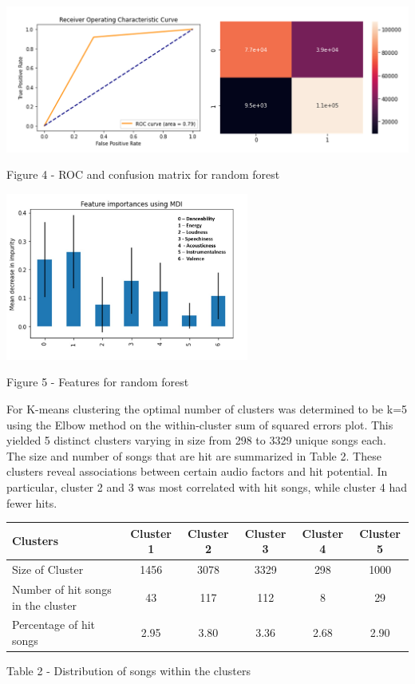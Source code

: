 \documentclass{article}
\begin{document}
\begin{center}
  \includegraphics[width=1\textwidth]{ROC for random forest.png}
\end{center}
\begin{center}
    \footnotesize{Figure 4 - ROC and confusion matrix for random forest} 
\end{center}



\begin{center}
  \includegraphics[width=0.6\textwidth]{output.png} %
\end{center}
\begin{center}
  \footnotesize{Figure 5 - Features for random forest}
\end{center}

For K-means clustering the optimal number of clusters was determined to be k=5 using the Elbow method on the within-cluster sum of squared errors plot. This yielded 5 distinct clusters varying in size from 298 to 3329 unique songs each. The size and number of songs that are hit are summarized in Table 2. These clusters reveal associations between certain audio factors and hit potential. In particular, cluster 2 and 3 was most correlated with hit songs, while cluster 4 had fewer hits. 

\begin{center}
\centering
  \begin{tabular}{|l|c|c|c|c|c|}
    \hline
    Clusters & Cluster 1 & Cluster 2 & Cluster 3 & Cluster 4 & Cluster 5 \\
    \hline
    Size of Cluster & 1456 & 3078 & 3329 & 298 & 1000 \\
    \hline
    Number of hit songs in the cluster & 43 & 117 & 112 & 8 & 29 \\
     \hline
 Percentage of hit songs& 2.95& 3.80& 3.36& 2.68&2.90\\\hline
  \end{tabular}
\end{center}
\begin{center}
    \footnotesize{Table 2 - Distribution of songs within the clusters}
\end{center}
\end{document}
